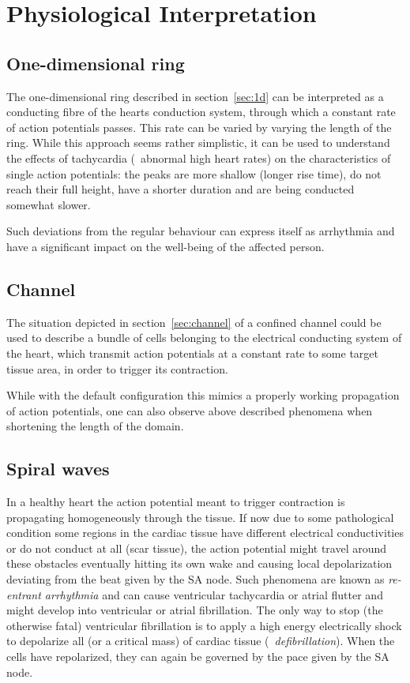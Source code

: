 \section{Physiological Interpretation}
\label{sec:phys}
\subsection{One-dimensional ring}
The one-dimensional ring described in section~\ref{sec:1d} can be interpreted
as a conducting fibre of the hearts conduction system, through which a constant
rate of action potentials passes. This rate can be varied by varying the length
of the ring. While this approach seems rather simplistic, it can be used to
understand the effects of tachycardia (\ie~abnormal high heart rates) on the
characteristics of single action potentials: the peaks are more shallow (longer
rise time), do not reach their full height, have a shorter duration and are
being conducted somewhat slower.

Such deviations from the regular behaviour can express itself as arrhythmia and
have a significant impact on the well-being of the affected person.


\subsection{Channel}
The situation depicted in section~\ref{sec:channel} of a confined channel could
be used to describe a bundle of cells belonging to the electrical conducting
system of the heart, which transmit action potentials at a constant rate to
some target tissue area, in order to trigger its contraction.

While with the default configuration this mimics a properly working propagation
of action potentials, one can also observe above described phenomena when
shortening the length of the domain.


\subsection{Spiral waves}
In a healthy heart the action potential meant to trigger contraction is
propagating homogeneously through the tissue. If now due to some pathological
condition some regions in the cardiac tissue have different electrical
conductivities or do not conduct at all (scar tissue), the action potential
might travel around these obstacles eventually hitting its own wake and causing
local depolarization deviating from the beat given by the SA node.  Such
phenomena are known as \emph{re-entrant arrhythmia} and can cause ventricular
tachycardia or atrial flutter and might develop into ventricular or atrial
fibrillation.  The only way to stop (the otherwise fatal) ventricular
fibrillation is to apply a high energy electrically shock to depolarize all (or
a critical mass) of cardiac tissue (\textrightarrow~\emph{defibrillation}).
When the cells have repolarized, they can again be governed by the pace given
by the SA node.

